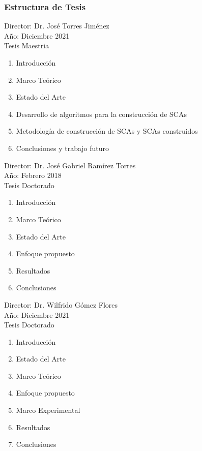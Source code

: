 \documentclass[
	11pt, %
]{beamer}
\begin{document}
\begin{frame}
  \frametitle{Estructura de Tesis}

  Director: Dr. José Torres Jiménez\\
  Año: Diciembre 2021\\
  Tesis Maestria\\
  \begin{enumerate}
  \item Introducción
  \item Marco Teórico
  \item Estado del Arte
  \item Desarrollo de algoritmos para la construcción de SCAs
  \item Metodología de construcción de SCAs y SCAs construidos
  \item Conclusiones y trabajo futuro
  \end{enumerate}

\end{frame}

\begin{frame}
  Director: Dr. José Gabriel Ramírez Torres\\
  Año: Febrero 2018\\
  Tesis Doctorado\\
  \begin{enumerate}
  \item Introducción
  \item Marco Teórico
  \item Estado del Arte
  \item Enfoque propuesto
  \item Resultados
  \item Conclusiones
  \end{enumerate}

\end{frame}

\begin{frame}
  
  Director: Dr. Wilfrido Gómez Flores\\
  Año: Diciembre 2021\\
  Tesis Doctorado\\
  \begin{enumerate}
  \item Introducción
  \item Estado del Arte
  \item Marco Teórico
  \item Enfoque propuesto
  \item Marco Experimental
  \item Resultados
  \item Conclusiones
  \end{enumerate}
  
\end{frame}
\end{document}
